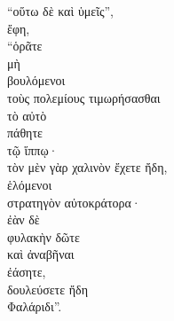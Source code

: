 {\large
\begin{greek}
\noindent ``οὕτω δὲ καὶ ὑμεῖς'', \\
ἔφη, \\
``ὁρᾶτε \\
\tabto{2em} μὴ \\
\tabto{2em} βουλόμενοι \\
\tabto{4em} τοὺς πολεμίους τιμωρήσασθαι \\
\tabto{2em} τὸ αὐτὸ \\
\tabto{2em} πάθητε \\
\tabto{4em} τῷ ἵππῳ· \\
τὸν μὲν γὰρ χαλινὸν ἔχετε ἤδη, \\
ἑλόμενοι \\
\tabto{2em} στρατηγὸν αὐτοκράτορα· \\
ἐὰν δὲ \\
φυλακὴν δῶτε \\
καὶ ἀναβῆναι \\
\tabto{2em} ἐάσητε, \\
δουλεύσετε ἤδη \\
\tabto{2em} Φαλάριδι”.\\

\end{greek}
}

